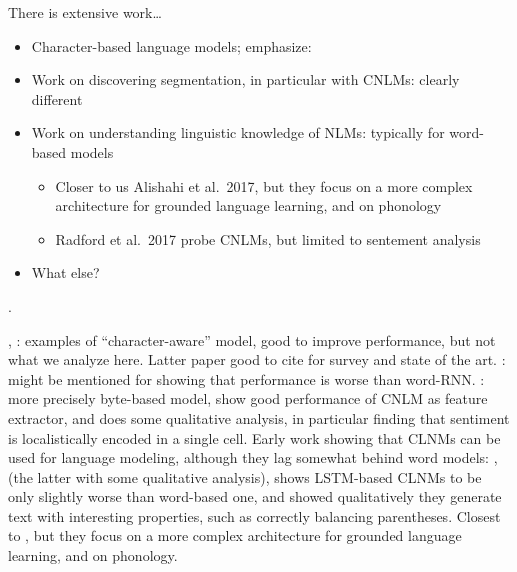 There is extensive work\ldots



\begin{itemize}
\item Character-based language models; emphasize:
\item Work on discovering segmentation, in particular with CNLMs:
  clearly different
\item Work on understanding linguistic knowledge of NLMs: typically
  for word-based models
  \begin{itemize}
  \item Closer to us Alishahi et al.~2017, but they focus on a more
    complex architecture for grounded language learning, and on
    phonology
  \item Radford et al.~2017 probe CNLMs, but limited to sentement
    analysis
  \end{itemize}
\item What else?
\end{itemize}

\cite{Kann:etal:2016}.


\cite{Kim:etal:2016}, \cite{Gerz:etal:2018}: examples of
``character-aware'' model, good to improve performance, but not what
we analyze here. Latter paper good to cite for survey and state of the
art. \cite{Bojanowski:etal:2016}: might be mentioned for showing that
performance is worse than word-RNN. \cite{Radford:etal:2017}: more
precisely byte-based model, show good performance of CNLM as feature
extractor, and does some qualitative analysis, in particular finding
that sentiment is localistically encoded in a single cell. Early work
showing that CLNMs can be used for language modeling, although they
lag somewhat behind word models: \cite{Mikolov:etal:2011},
\cite{Sutskever:etal:2011} (the latter with some qualitative
analysis), \cite{Graves:2014} shows LSTM-based CLNMs to be only
slightly worse than word-based one, and showed qualitatively they
generate text with interesting properties, such as correctly balancing
parentheses. Closest to \cite{Alishahi:etal:2017}, but they focus on a
more complex architecture for grounded language learning, and on
phonology.

